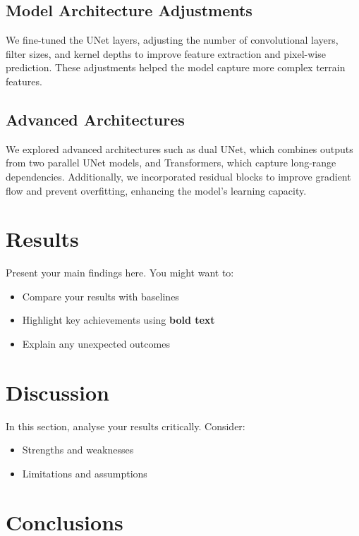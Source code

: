 \documentclass[11pt]{article}
\begin{document}
\begin{multicols}{2}
        \subsection{Model Architecture Adjustments}
        We fine-tuned the UNet layers, adjusting the number of convolutional layers, filter sizes, and kernel depths to improve feature extraction and pixel-wise prediction. These adjustments helped the model capture more complex terrain features.
        
        \subsection{Advanced Architectures}
        We explored advanced architectures such as dual UNet, which combines outputs from two parallel UNet models, and Transformers, which capture long-range dependencies. Additionally, we incorporated residual blocks to improve gradient flow and prevent overfitting, enhancing the model’s learning capacity.





        \section{Results}
        Present your main findings here. You might want to:
        \begin{itemize}
            \item Compare your results with baselines
            \item Highlight key achievements using \textbf{bold text}
            \item Explain any unexpected outcomes
        \end{itemize}

        \section{Discussion}
        In this section, analyse your results critically. Consider:
        \begin{itemize}
            \item Strengths and weaknesses
            \item Limitations and assumptions
        \end{itemize}

        \section{Conclusions}

\end{multicols}
\end{document}
